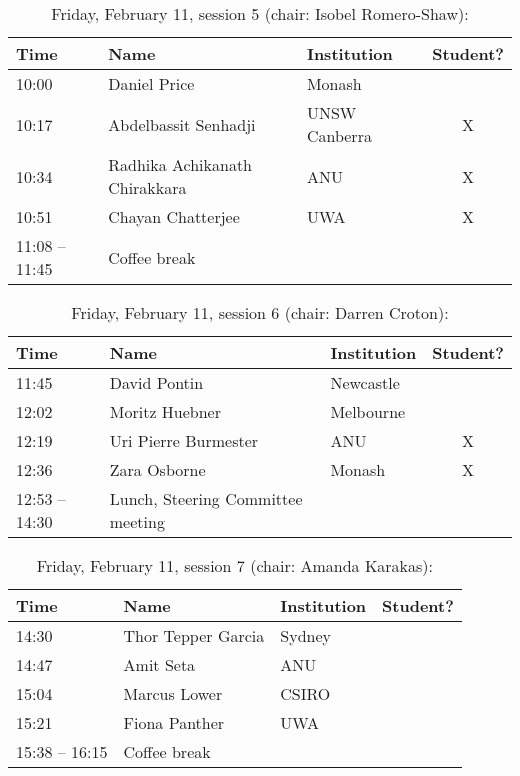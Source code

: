 \documentclass[amsmath,onecolumn]{revtex4-1}
\begin{document}
\begin{table}[!htbp]
	\centering
	\caption{Friday, February 11, session 5 (chair: Isobel Romero-Shaw):}
\begin{tabular}{| l | l | l | c |}
	\hline
	Time & Name  & Institution & Student? \\ 		
	\hline
	10:00 & {Daniel Price} & Monash &  \\	
	10:17 & {Abdelbassit	Senhadji} & UNSW Canberra & X \\
	10:34 & {Radhika Achikanath Chirakkara} & ANU & X \\
	10:51 & Chayan Chatterjee & UWA & X \\
	11:08 -- 11:45 & Coffee break & & \\
	\hline
\end{tabular}
\end{table}


\begin{table}[!htbp]
	\centering
	\caption{Friday, February 11, session 6 (chair: Darren Croton):}
\begin{tabular}{| l | l | l | c |}
	\hline
	Time & Name  & Institution & Student? \\ 		
	\hline
	11:45 & {David	Pontin} & Newcastle &  \\
	12:02 & {Moritz	Huebner} & Melbourne &  \\
	12:19 & {Uri Pierre Burmester} &  ANU & X \\
	12:36 & {Zara Osborne} & Monash & X \\
	12:53 -- 14:30 & Lunch, Steering Committee meeting & & \\
	\hline
\end{tabular}
\end{table}	

	
\begin{table}[!htbp]
	\centering
	\caption{Friday, February 11, session 7 (chair: Amanda Karakas):}
\begin{tabular}{| l | l | l | c |}
	\hline
	Time & Name  & Institution & Student? \\ 		
	\hline
	14:30 & {Thor Tepper Garcia} & Sydney &  \\
	14:47 & {Amit Seta} & ANU &  \\
	15:04 & {Marcus Lower} & CSIRO & \\
	15:21 & {Fiona	Panther} & UWA &  \\
	15:38 -- 16:15 & Coffee break & & \\
	\hline
\end{tabular}
\end{table}
\end{document}
